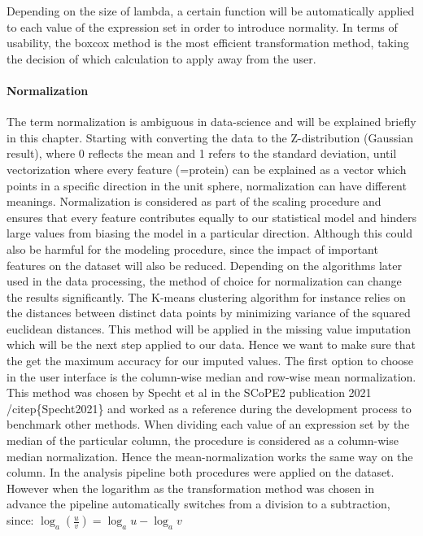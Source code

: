 \documentclass[
]{article}
\begin{document}
Depending on the size of lambda, a certain function will be
automatically applied to each value of the expression set in order to
introduce normality. In terms of usability, the boxcox method is the
most efficient transformation method, taking the decision of which
calculation to apply away from the user.

\hypertarget{normalization}{%
\paragraph{Normalization}\label{normalization}}

The term normalization is ambiguous in data-science and will be
explained briefly in this chapter. Starting with converting the data to
the Z-distribution (Gaussian result), where 0 reflects the mean and 1
refers to the standard deviation, until vectorization where every
feature (=protein) can be explained as a vector which points in a
specific direction in the unit sphere, normalization can have different
meanings. Normalization is considered as part of the scaling procedure
and ensures that every feature contributes equally to our statistical
model and hinders large values from biasing the model in a particular
direction. Although this could also be harmful for the modeling
procedure, since the impact of important features on the dataset will
also be reduced. Depending on the algorithms later used in the data
processing, the method of choice for normalization can change the
results significantly. The K-means clustering algorithm for instance
relies on the distances between distinct data points by minimizing
variance of the squared euclidean distances. This method will be applied
in the missing value imputation which will be the next step applied to
our data. Hence we want to make sure that the get the maximum accuracy
for our imputed values. The first option to choose in the user interface
is the column-wise median and row-wise mean normalization. This method
was chosen by Specht et al in the SCoPE2 publication 2021
/citep\{Specht2021\} and worked as a reference during the development
process to benchmark other methods. When dividing each value of an
expression set by the median of the particular column, the procedure is
considered as a column-wise median normalization. Hence the
mean-normalization works the same way on the column. In the analysis
pipeline both procedures were applied on the dataset. However when the
logarithm as the transformation method was chosen in advance the
pipeline automatically switches from a division to a subtraction, since:
\(\log_a \left(\frac{u}{v}\right)=\log_a u-\log_a v\)
\end{document}
